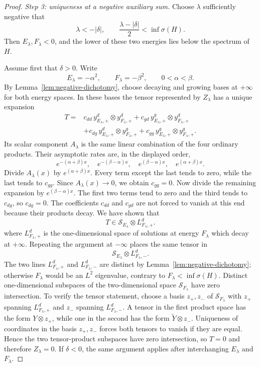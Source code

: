\documentclass[11pt]{amsart}
\numberwithin{equation}{section}
\theoremstyle{remark}
\newcommand{\Sc}{\mathcal S}
\begin{document}
\begin{proof}
\smallskip
\noindent
\emph{Step 3: uniqueness at a negative auxiliary sum.}
Choose $\lambda$ sufficiently negative that
\begin{equation}
 \lambda<-|\delta|,
 \qquad
 \frac{\lambda-|\delta|}{2}<\inf\sigma(H).
 \label{eq:negative-lambda-choice}
\end{equation}
Then $E_\lambda,F_\lambda<0$, and the lower of these two energies lies below
the spectrum of $H$.

Assume first that $\delta>0$.  Write
\[
 E_\lambda=-\alpha^2,
 \qquad
 F_\lambda=-\beta^2,
 \qquad 0<\alpha<\beta.
\]
By Lemma~\ref{lem:negative-dichotomy}, choose decaying and growing bases at
$+\infty$ for both energy spaces.  In these bases the tensor represented by
$Z_\lambda$ has a unique expansion
\begin{align*}
 T={}&c_{dd}\,y^d_{E_\lambda,+}\otimes y^d_{F_\lambda,+}
 +c_{gd}\,y^g_{E_\lambda,+}\otimes y^d_{F_\lambda,+}\\
 &+c_{dg}\,y^d_{E_\lambda,+}\otimes y^g_{F_\lambda,+}
 +c_{gg}\,y^g_{E_\lambda,+}\otimes y^g_{F_\lambda,+}.
\end{align*}
Its scalar component $A_\lambda$ is the same linear combination of the four
ordinary products.  Their asymptotic rates are, in the displayed order,
\[
 e^{-(\alpha+\beta)x},
 \quad e^{-(\beta-\alpha)x},
 \quad e^{(\beta-\alpha)x},
 \quad e^{(\alpha+\beta)x}.
\]
Divide $A_\lambda(x)$ by $e^{(\alpha+\beta)x}$.  Every term except the last
tends to zero, while the last tends to $c_{gg}$.  Since
$A_\lambda(x)\to0$, we obtain $c_{gg}=0$.  Now divide the remaining expansion
by $e^{(\beta-\alpha)x}$.  The first two terms tend to zero and the third
tends to $c_{dg}$, so $c_{dg}=0$.  The coefficients $c_{dd}$ and $c_{gd}$ are
not forced to vanish at this end because their products decay.  We have shown
that
\[
 T\in\Sc_{E_\lambda}\otimes L^d_{F_\lambda,+}.
\]
where $L^d_{F_\lambda,+}$ is the one-dimensional space of solutions at energy
$F_\lambda$ which decay at $+\infty$.  Repeating the argument at $-\infty$
places the same tensor in
\[
 \Sc_{E_\lambda}\otimes L^d_{F_\lambda,-}.
\]
The two lines $L^d_{F_\lambda,+}$ and $L^d_{F_\lambda,-}$ are distinct by
Lemma~\ref{lem:negative-dichotomy}; otherwise $F_\lambda$ would be an $L^2$
eigenvalue, contrary to $F_\lambda<\inf\sigma(H)$.  Distinct one-dimensional subspaces of the
two-dimensional space $\Sc_{F_\lambda}$ have zero intersection.  To verify
the tensor statement, choose a basis $z_+,z_-$ of $\Sc_{F_\lambda}$ with
$z_+$ spanning $L^d_{F_\lambda,+}$ and $z_-$ spanning
$L^d_{F_\lambda,-}$.  A tensor in the first product space has the form
$Y\otimes z_+$, while one in the second has the form $\widetilde Y\otimes
z_-$.  Uniqueness of coordinates in the basis $z_+,z_-$ forces both tensors
to vanish if they are equal.  Hence the two tensor-product subspaces have zero
intersection, so $T=0$ and therefore $Z_\lambda=0$.  If
$\delta<0$, the same argument applies after interchanging $E_\lambda$ and
$F_\lambda$.


\end{proof}
\end{document}
